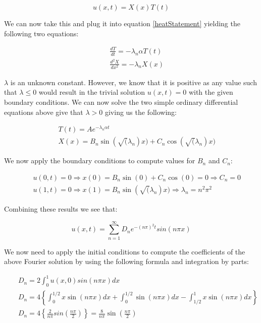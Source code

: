 \documentclass[a4paper,12pt,titlepage]{article}
\begin{document}
\begin{equation}
u(x,t) = X(x)T(t)
\end{equation}

We can now take this and plug it into equation \ref{heatStatement} yielding the following two equations:

\begin{eqnarray}
&& \frac{dT}{dt} = -\lambda_n \alpha T(t)\\
\label{DTdt}
&& \frac{d^2X}{dx^2} = -\lambda_n X(x)
\label{D2Xdx2}
\end{eqnarray}

$\lambda$ is an unknown constant.  However, we know that it is positive as any value such that $\lambda \le 0$ would result in the trivial solution $u(x,t) = 0$ with the given boundary conditions.  We can now solve the two simple ordinary differential equations above give that $\lambda > 0$ giving us the following:

\begin{eqnarray}
&& T(t) = A e^{-\lambda_n \alpha t}\\
&& X(x) = B_n \sin(\sqrt(\lambda_n)x) + C_n\cos(\sqrt(\lambda_n)x)
\end{eqnarray}

We now apply the boundary conditions to compute values for $B_n$ and $C_n$:

\begin{eqnarray}
&&u(0,t) = 0 \Rightarrow x(0) = B_n \sin(0) + C_n\cos(0) = 0 \Rightarrow C_n = 0\\
&&u(1,t) = 0 \Rightarrow x(1) = B_n \sin(\sqrt(\lambda_n)x) \Rightarrow \lambda_n = n^2\pi^2
\end{eqnarray}

Combining these results we see that:

\begin{equation}
u(x,t) = \sum_{n=1}^{\infty}D_n e^{-(n\pi)^2t}sin(n\pi x)
\end{equation}

We now need to apply the initial conditions to compute the coefficients of the above Fourier solution by using the following formula and integration by parts:

\begin{eqnarray}
&& D_n = 2 \int_0^1 u(x,0) sin(n\pi x)dx\nonumber \\
&& D_n = 4 \left\{\int_0^{1/2} x \sin(n \pi x) dx + \int_{0}^{1/2} \sin(n \pi x) dx - \int_{1/2}^1 x \sin(n \pi x)dx \right\}\nonumber \\
&& D_n = 4 \left\{\frac{2}{n \pi} sin(\frac{n \pi}{2}) \right\} = \frac{8}{n \pi} \sin(\frac{n \pi}{2}) 
\end{eqnarray}
\end{document}
